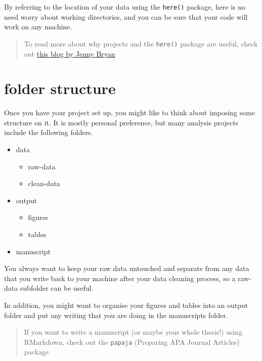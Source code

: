 \documentclass[
  letterpaper,
  DIV=11,
  numbers=noendperiod]{scrreprt}
\providecommand{\tightlist}{%
  \setlength{\itemsep}{0pt}\setlength{\parskip}{0pt}}\usepackage{longtable,booktabs,array}
\begin{document}
By referring to the location of your data using the \texttt{here()}
package, here is no need worry about working directories, and you can be
sure that your code will work on any machine.

\begin{quote}
To read more about why projects and the \texttt{here()} package are
useful, check out
\href{https://www.tidyverse.org/blog/2017/12/workflow-vs-script/}{this
blog by Jenny Bryan}
\end{quote}

\section{folder structure}\label{folder-structure}

Once you have your project set up, you might like to think about
imposing some structure on it. It is mostly personal preference, but
many analysis projects include the following folders.

\begin{itemize}
\tightlist
\item
  data

  \begin{itemize}
  \tightlist
  \item
    raw-data
  \item
    clean-data
  \end{itemize}
\item
  output

  \begin{itemize}
  \tightlist
  \item
    figures
  \item
    tables
  \end{itemize}
\item
  manuscript
\end{itemize}

You always want to keep your raw data untouched and separate from any
data that you write back to your machine after your data cleaning
process, so a raw-data subfolder can be useful.

In addition, you might want to organise your figures and tables into an
output folder and put any writing that you are doing in the manuscripts
folder.

\begin{quote}
If you want to write a manuscript (or maybe your whole thesis!) using
RMarkdown, check out the \texttt{papaja} (Preparing APA Journal
Articles) package
\end{quote}
\end{document}
